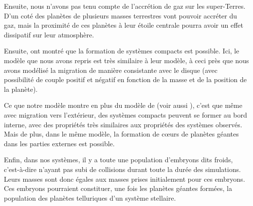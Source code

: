 Ensuite, nous n'avons pas tenu compte de l'accrétion de gaz sur les super-Terres. D'un coté des planètes de plusieurs masses terrestres vont pouvoir accréter du gaz, mais la proximité de ces planètes à leur étoile centrale pourra avoir un effet dissipatif sur leur atmosphère. 

Ensuite, \cite{terquem2007migration} ont montré que la formation de systèmes compacts est possible. Ici, le modèle que nous avons repris est très similaire à leur modèle, à ceci près que nous avons modélisé la migration de manière consistante avec le disque (avec possibilité de couple positif et négatif en fonction de la masse et de la position de la planète). 

Ce que notre modèle montre en plus du modèle de \cite{terquem2007migration} (voir aussi \cite{ogihara2007accretion,
cresswell2008three}), c'est que même avec migration vers l'extérieur, des systèmes compacts peuvent se former au bord interne,
avec des propriétés très similaires aux propriétés des systèmes observés. Mais de plus, dans le même modèle, la formation de
cœurs de planètes géantes dans les parties externes est possible. 

\bigskip

Enfin, dans nos systèmes, il y a toute une population d'embryons dits froids, c'est-à-dire n'ayant pas subi de collisions durant toute la durée des simulations. Leurs masses sont donc égales aux masses prises initialement pour ces embryons. Ces embryons pourraient constituer, une fois les planètes géantes formées, la population des planètes telluriques d'un système stellaire. 
